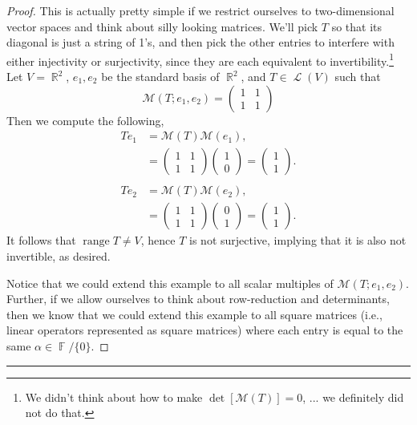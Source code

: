 \documentclass[letterpaper, 12pt]{amsart}
\DeclareMathOperator{\R}{\mathbb{R}}				%
\DeclareMathOperator{\F}{\mathbb{F}}				%
\DeclareMathOperator{\Ell}{\mathscr{L}}				%
\DeclareMathOperator{\range}{\text{range }}			%
\theoremstyle{definition}  							%
\begin{document}
		\begin{proof}
		This is actually pretty simple if we restrict ourselves to two-dimensional vector spaces and think about silly looking matrices.
		We'll pick $T$ so that its diagonal is just a string of 1's, and then pick the other entries to interfere with either injectivity or surjectivity, since they are each equivalent to invertibility.\footnote{We didn't think about how to make $\det{\left[ \mathcal{M}(T) \right]} = 0$, ... we definitely did not do that.}
		Let $V = \R^{2}$, $e_{1},e_{2}$ be the standard basis of $\R^2$, and $T \in \Ell(V)$ such that $$\mathcal{M}(T; e_{1},e_{2}) = \begin{pmatrix} 1 & 1 \\ 1 & 1 \end{pmatrix}$$
		Then we compute the following,
			\begin{align*}
				Te_{1} &= \mathcal{M}(T)\mathcal{M}(e_{1}), \\
				&= \begin{pmatrix} 1 & 1 \\ 1 & 1 \end{pmatrix} \begin{pmatrix} 1 \\ 0 \end{pmatrix} = \begin{pmatrix} 1 \\ 1 \end{pmatrix}. \\
				\\
				Te_{2} &= \mathcal{M}(T)\mathcal{M}(e_{2}), \\
				&= \begin{pmatrix} 1 & 1 \\ 1 & 1 \end{pmatrix} \begin{pmatrix} 0 \\ 1 \end{pmatrix} = \begin{pmatrix} 1 \\ 1 \end{pmatrix}.
			\end{align*}
		It follows that $\range T \neq V$, hence $T$ is not surjective, implying that it is also not invertible, as desired.

		Notice that we could extend this example to all scalar multiples of $\mathcal{M}(T; e_{1},e_{2})$.
		Further, if we allow ourselves to think about row-reduction and determinants, then we know that we could extend this example to all square matrices (i.e., linear operators represented as square matrices) where each entry is equal to the same $\alpha \in \F/\{0\}$.
		\end{proof}
		\vspace*{2mm}
		\hrule
		\vspace*{2mm}
\end{document}
